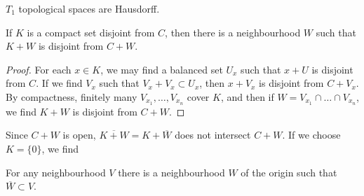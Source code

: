 \begin{corollary}
    $T_1$ topological spaces are Hausdorff.
\end{corollary}

\begin{corollary}
    If $K$ is a compact set disjoint from $C$, then there is a neighbourhood $W$ such that $K + W$ is disjoint from $C + W$.
\end{corollary}
\begin{proof}
    For each $x \in K$, we may find a balanced set $U_x$ such that $x + U$ is disjoint from $C$. If we find $V_x$ such that $V_x + V_x \subset U_x$, then $x + V_x$ is disjoint from $C + V_x$. By compactness, finitely many $V_{x_1}, \dots, V_{x_n}$ cover $K$, and then if $W = V_{x_1} \cap \dots \cap V_{x_n}$, we find $K + W$ is disjoint from $C + W$.
\end{proof}

Since $C + W$ is open, $\overline{K + W} = K + \overline{W}$ does not intersect $C + W$. If we choose $K = \{ 0 \}$, we find

\begin{corollary}
    For any neighbourhood $V$ there is a neighbourhood $W$ of the origin such that $\overline{W} \subset V$.
\end{corollary}

